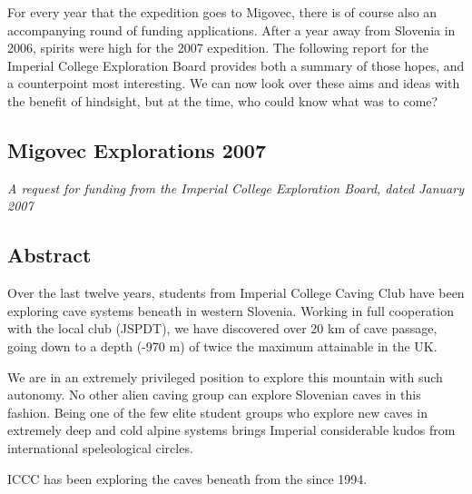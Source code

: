 For every year that the expedition goes to Migovec, there is of course also an accompanying round of funding applications. After a year away from Slovenia in 2006, spirits were high for the 2007 expedition. The following report for the Imperial College Exploration Board provides both a summary of those hopes, and a counterpoint most interesting. We can now look over these aims and ideas with the benefit of hindsight, but at the time, who could know what was to come?


\newpage

\subsection{Migovec Explorations 2007}
\textit{A request for funding from the Imperial College Exploration Board, dated January 2007}

\subsection{Abstract}

Over the last twelve years, students from Imperial College Caving Club have been exploring cave systems beneath  in western Slovenia. Working in full cooperation with the local club (JSPDT), we have discovered over 20 km of cave passage, going down to a depth (-970 m) of twice the maximum attainable in the UK.

We are in an extremely privileged position to explore this mountain with such autonomy. No other alien caving group can explore Slovenian caves in this fashion. Being one of the few elite student groups who explore new caves in extremely deep and cold alpine systems brings Imperial considerable kudos from international speleological circles.


\begin{pagefigure}
      \checkoddpage \ifoddpage \forcerectofloat \else \forceversofloat \fi
      \centering
       \label{surface bashing}
  \caption{ICCC has been exploring the caves beneath  from the  since 1994. }
\end{pagefigure}


